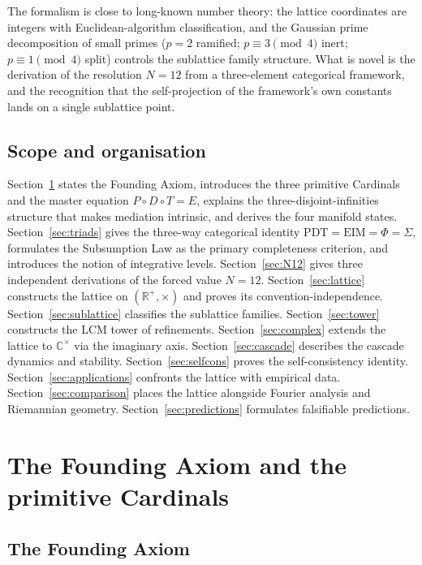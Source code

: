 \documentclass[11pt,a4paper]{article}
\theoremstyle{definition}
\theoremstyle{remark}
\newcommand{\R}{\mathbb{R}}
\newcommand{\C}{\mathbb{C}}
\begin{document}
The formalism is close to long-known number theory: the lattice coordinates are integers with Euclidean-algorithm classification, and the Gaussian prime decomposition of small primes ($p=2$ ramified; $p\equiv 3\pmod 4$ inert; $p\equiv 1\pmod 4$ split) controls the sublattice family structure. What is novel is the derivation of the resolution $N=12$ from a three-element categorical framework, and the recognition that the self-projection of the framework's own constants lands on a single sublattice point.

\subsection{Scope and organisation}

Section~\ref{sec:primitives} states the Founding Axiom, introduces the three primitive Cardinals and the master equation $P\circ D\circ T = E$, explains the three-disjoint-infinities structure that makes mediation intrinsic, and derives the four manifold states. Section~\ref{sec:triads} gives the three-way categorical identity $\mathrm{PDT} = \mathrm{EIM} = \Phi = \Sigma$, formulates the Subsumption Law as the primary completeness criterion, and introduces the notion of integrative levels. Section~\ref{sec:N12} gives three independent derivations of the forced value $N=12$. Section~\ref{sec:lattice} constructs the lattice on $(\R^{+},\times)$ and proves its convention-independence. Section~\ref{sec:sublattice} classifies the sublattice families. Section~\ref{sec:tower} constructs the LCM tower of refinements. Section~\ref{sec:complex} extends the lattice to $\C^{\times}$ via the imaginary axis. Section~\ref{sec:cascade} describes the cascade dynamics and stability. Section~\ref{sec:selfcons} proves the self-consistency identity. Section~\ref{sec:applications} confronts the lattice with empirical data. Section~\ref{sec:comparison} places the lattice alongside Fourier analysis and Riemannian geometry. Section~\ref{sec:predictions} formulates falsifiable predictions.

\section{The Founding Axiom and the primitive Cardinals}\label{sec:primitives}

\subsection{The Founding Axiom}
\end{document}
